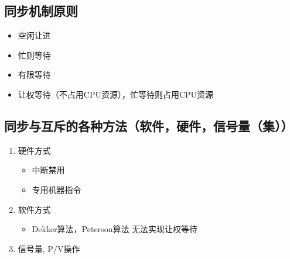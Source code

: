 \documentclass[11pt]{article}
\begin{document}
\subsection{同步机制原则}
\label{sec-2-8}
\begin{itemize}
\item 空闲让进
\item 忙则等待
\item 有限等待
\item 让权等待（不占用CPU资源），忙等待则占用CPU资源
\end{itemize}
\subsection{同步与互斥的各种方法（软件，硬件，信号量（集））}
\label{sec-2-9}
\begin{enumerate}
\item 硬件方式
\label{sec-2-9-0-1}
\begin{itemize}
\item 中断禁用
\item 专用机器指令
\end{itemize}
\item 软件方式
\label{sec-2-9-0-2}
\begin{itemize}
\item Dekker算法，Peterson算法 无法实现让权等待
\end{itemize}
\item 信号量, P/V操作
\label{sec-2-9-0-3}
\end{enumerate}
\end{document}
